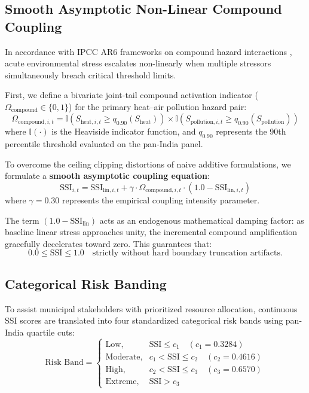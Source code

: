 \subsection{Smooth Asymptotic Non-Linear Compound Coupling}
In accordance with IPCC AR6 frameworks on compound hazard interactions \citep{zscheischler2018future}, acute environmental stress escalates non-linearly when multiple stressors simultaneously breach critical threshold limits.

First, we define a bivariate joint-tail compound activation indicator ($\Omega_{\text{compound}} \in \{0, 1\}$) for the primary heat--air pollution hazard pair:
\begin{equation}
    \Omega_{\text{compound}, i, t} = \mathbb{I}\left(S_{\text{heat}, i, t} \ge q_{0.90}(S_{\text{heat}})\right) \times \mathbb{I}\left(S_{\text{pollution}, i, t} \ge q_{0.90}(S_{\text{pollution}})\right)
\end{equation}
where $\mathbb{I}(\cdot)$ is the Heaviside indicator function, and $q_{0.90}$ represents the 90th percentile threshold evaluated on the pan-India panel.

To overcome the ceiling clipping distortions of naive additive formulations, we formulate a \textbf{smooth asymptotic coupling equation}:
\begin{equation}
    \label{eq:smooth_ssi}
    \text{SSI}_{i, t} = \text{SSI}_{\text{lin}, i, t} + \gamma \cdot \Omega_{\text{compound}, i, t} \cdot \left(1.0 - \text{SSI}_{\text{lin}, i, t}\right)
\end{equation}
where $\gamma = 0.30$ represents the empirical coupling intensity parameter. 

The term $(1.0 - \text{SSI}_{\text{lin}})$ acts as an endogenous mathematical damping factor: as baseline linear stress approaches unity, the incremental compound amplification gracefully decelerates toward zero. This guarantees that:
\begin{equation}
    0.0 \le \text{SSI} \le 1.0 \quad \text{strictly without hard boundary truncation artifacts.}
\end{equation}

\subsection{Categorical Risk Banding}
To assist municipal stakeholders with prioritized resource allocation, continuous SSI scores are translated into four standardized categorical risk bands using pan-India quartile cuts:
\begin{equation}
    \text{Risk Band} = \begin{cases}
        \text{Low}, & \text{SSI} \le c_1 \quad (c_1 = 0.3284) \\
        \text{Moderate}, & c_1 < \text{SSI} \le c_2 \quad (c_2 = 0.4616) \\
        \text{High}, & c_2 < \text{SSI} \le c_3 \quad (c_3 = 0.6570) \\
        \text{Extreme}, & \text{SSI} > c_3
    \end{cases}
\end{equation}

